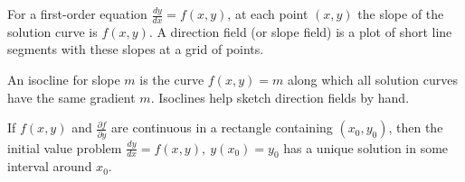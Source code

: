 \documentclass[11pt]{article}
\newcommand{\cle}[1]{{\popxbold\color{popdark}#1}}
\begin{document}
\begin{definition}
For a first-order equation $\frac{dy}{dx} = f(x,y)$, at each point $(x,y)$ the slope of the solution curve is $f(x,y)$. A \cle{direction field} (or \cle{slope field}) is a plot of short line segments with these slopes at a grid of points.
\end{definition}

\begin{definition}[Isoclines]
An \cle{isocline} for slope $m$ is the curve $f(x,y) = m$ along which all solution curves have the same gradient $m$. Isoclines help sketch direction fields by hand.
\end{definition}

\begin{propriete}
If $f(x,y)$ and $\frac{\partial f}{\partial y}$ are continuous in a rectangle containing $(x_0,y_0)$, then the initial value problem $\frac{dy}{dx}=f(x,y),\ y(x_0)=y_0$ has a unique solution in some interval around $x_0$.
\end{propriete}
\end{document}
